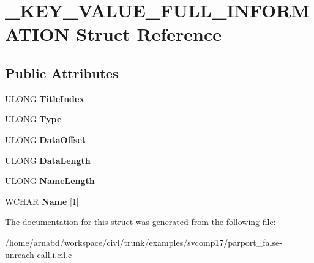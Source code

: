 \hypertarget{struct__KEY__VALUE__FULL__INFORMATION}{}\section{\+\_\+\+K\+E\+Y\+\_\+\+V\+A\+L\+U\+E\+\_\+\+F\+U\+L\+L\+\_\+\+I\+N\+F\+O\+R\+M\+A\+T\+I\+O\+N Struct Reference}
\label{struct__KEY__VALUE__FULL__INFORMATION}
\subsection*{Public Attributes}
\begin{DoxyCompactItemize}
\item 
\hypertarget{struct__KEY__VALUE__FULL__INFORMATION_a17e69c3557789b6f6dc0e914604be3dd}{}U\+L\+O\+N\+G {\bfseries Title\+Index}\label{struct__KEY__VALUE__FULL__INFORMATION_a17e69c3557789b6f6dc0e914604be3dd}

\item 
\hypertarget{struct__KEY__VALUE__FULL__INFORMATION_a2d830e8dad303c46a6b9d5f159e59994}{}U\+L\+O\+N\+G {\bfseries Type}\label{struct__KEY__VALUE__FULL__INFORMATION_a2d830e8dad303c46a6b9d5f159e59994}

\item 
\hypertarget{struct__KEY__VALUE__FULL__INFORMATION_a513fbe4d9ba9d970466025722570355a}{}U\+L\+O\+N\+G {\bfseries Data\+Offset}\label{struct__KEY__VALUE__FULL__INFORMATION_a513fbe4d9ba9d970466025722570355a}

\item 
\hypertarget{struct__KEY__VALUE__FULL__INFORMATION_a3e34c3d675c4b63a21771d4327866e36}{}U\+L\+O\+N\+G {\bfseries Data\+Length}\label{struct__KEY__VALUE__FULL__INFORMATION_a3e34c3d675c4b63a21771d4327866e36}

\item 
\hypertarget{struct__KEY__VALUE__FULL__INFORMATION_a670bfe92a5da1af545c889bfb869c73c}{}U\+L\+O\+N\+G {\bfseries Name\+Length}\label{struct__KEY__VALUE__FULL__INFORMATION_a670bfe92a5da1af545c889bfb869c73c}

\item 
\hypertarget{struct__KEY__VALUE__FULL__INFORMATION_a96d415504bc2f13675a6180c50dcff01}{}W\+C\+H\+A\+R {\bfseries Name} \mbox{[}1\mbox{]}\label{struct__KEY__VALUE__FULL__INFORMATION_a96d415504bc2f13675a6180c50dcff01}

\end{DoxyCompactItemize}


The documentation for this struct was generated from the following file\+:\begin{DoxyCompactItemize}
\item 
/home/arnabd/workspace/civl/trunk/examples/svcomp17/parport\+\_\+false-\/unreach-\/call.\+i.\+cil.\+c\end{DoxyCompactItemize}
